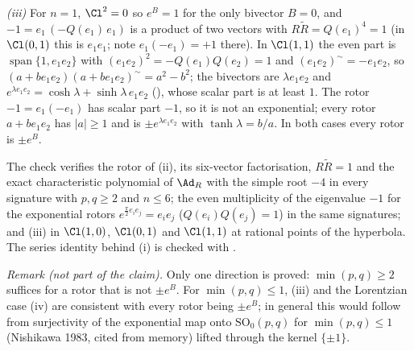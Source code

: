 \emph{(iii)} For $n = 1$, $\Cl^{2} = 0$ so $e^{B} = 1$ for the only bivector $B = 0$, and $-1 = e_1\,(-Q(e_1)\,e_1)$ is a product of two vectors with $R\tilde R = Q(e_1)^{4} = 1$ (in $\Cl(0,1)$ this is $e_1 e_1$; note $e_1(-e_1) = +1$ there). In $\Cl(1,1)$ the even part is $\operatorname{span}\{1, e_1e_2\}$ with $(e_1e_2)^{2} = -Q(e_1)Q(e_2) = 1$ and $(e_1e_2)^{\sim} = -e_1e_2$, so $(a + b e_1e_2)(a + b e_1e_2)^{\sim} = a^{2} - b^{2}$; the bivectors are $\lambda e_1 e_2$ and $e^{\lambda e_1e_2} = \cosh\lambda + \sinh\lambda\, e_1e_2$ (), whose scalar part is at least $1$. The rotor $-1 = e_1 (-e_1)$ has scalar part $-1$, so it is not an exponential; every rotor $a + b e_1e_2$ has $\lvert a \rvert \ge 1$ and is $\pm e^{\lambda e_1 e_2}$ with $\tanh\lambda = b/a$. In both cases every rotor is $\pm e^{B}$.

The check verifies the rotor of (ii), its six-vector factorisation, $R\tilde R = 1$ and the exact characteristic polynomial of $\Ad_R$ with the simple root $-4$ in every signature with $p, q \ge 2$ and $n \le 6$; the even multiplicity of the eigenvalue $-1$ for the exponential rotors $e^{\frac{\pi}{2}e_ie_j} = e_ie_j$ ($Q(e_i)Q(e_j) = 1$) in the same signatures; and (iii) in $\Cl(1,0)$, $\Cl(0,1)$ and $\Cl(1,1)$ at rational points of the hyperbola. The series identity behind (i) is checked with .

\emph{Remark (not part of the claim).} Only one direction is proved: $\min(p, q) \ge 2$ suffices for a rotor that is not $\pm e^{B}$. For $\min(p, q) \le 1$, (iii) and the Lorentzian case (iv) are consistent with every rotor being $\pm e^{B}$; in general this would follow from surjectivity of the exponential map onto $\mathrm{SO}_0(p, q)$ for $\min(p, q) \le 1$ (Nishikawa 1983, cited from memory) lifted through the kernel $\{\pm 1\}$.
